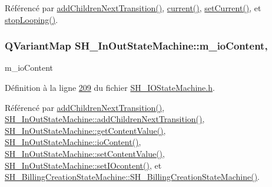 Référencé par \hyperlink{classSh__LoopingInOutStateMachine_acfd8d0711c793b13c759f6c50be6a315}{add\-Children\-Next\-Transition()}, \hyperlink{classSh__LoopingInOutStateMachine_a1b4661f92617e9cdbacc1be354f2a54a}{current()}, \hyperlink{classSh__LoopingInOutStateMachine_ac94dde3e948b7b86a575e421cce2b9ba}{set\-Current()}, et \hyperlink{classSh__LoopingInOutStateMachine_a8788fa9e4c3149bcf7554e2a2b960c51}{stop\-Looping()}.

\hypertarget{classSH__InOutStateMachine_a661a1c7bd3b1086b3b5cd60ca957ecbd}{
\subsubsection[{m\-\_\-io\-Content}]{\setlength{\rightskip}{0pt plus 5cm}Q\-Variant\-Map S\-H\-\_\-\-In\-Out\-State\-Machine\-::m\-\_\-io\-Content\hspace{0.3cm}{\ttfamily [protected]}, {\ttfamily [inherited]}}}\label{classSH__InOutStateMachine_a661a1c7bd3b1086b3b5cd60ca957ecbd}


m\-\_\-io\-Content 



Définition à la ligne \hyperlink{SH__IOStateMachine_8h_source_l00209}{209} du fichier \hyperlink{SH__IOStateMachine_8h_source}{S\-H\-\_\-\-I\-O\-State\-Machine.\-h}.



Référencé par \hyperlink{classSh__LoopingInOutStateMachine_acfd8d0711c793b13c759f6c50be6a315}{add\-Children\-Next\-Transition()}, \hyperlink{classSH__InOutStateMachine_a689e5513ef6ef3fc1598efacd413372e}{S\-H\-\_\-\-In\-Out\-State\-Machine\-::add\-Children\-Next\-Transition()}, \hyperlink{classSH__InOutStateMachine_a2cdd914f1e597ac52d021106eec75c89}{S\-H\-\_\-\-In\-Out\-State\-Machine\-::get\-Content\-Value()}, \hyperlink{classSH__InOutStateMachine_a79b456cb2e353cb61ef9fe19c97fc8fb}{S\-H\-\_\-\-In\-Out\-State\-Machine\-::io\-Content()}, \hyperlink{classSH__InOutStateMachine_aa2766b7a7ba39c35a10df7fc0c151b4f}{S\-H\-\_\-\-In\-Out\-State\-Machine\-::set\-Content\-Value()}, \hyperlink{classSH__InOutStateMachine_a23a925522339132a51d16a7cff9074b9}{S\-H\-\_\-\-In\-Out\-State\-Machine\-::set\-I\-Ocontent()}, et \hyperlink{classSH__BillingCreationStateMachine_ad62b77fa4aeafe200056ff3974562f83}{S\-H\-\_\-\-Billing\-Creation\-State\-Machine\-::\-S\-H\-\_\-\-Billing\-Creation\-State\-Machine()}.

